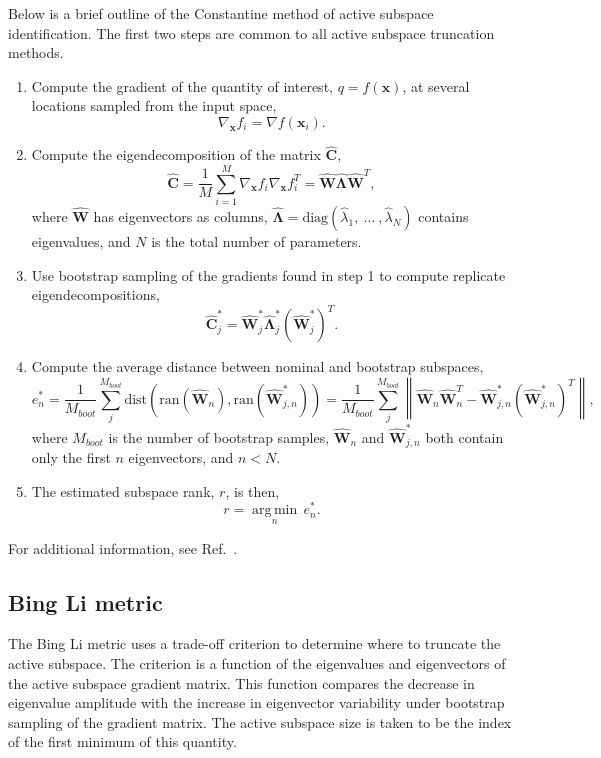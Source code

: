 Below is a brief outline of the Constantine method of active subspace 
identification. The first two steps are common to all active subspace 
truncation methods.
\begin{enumerate}
\item Compute the gradient of the quantity of interest, $q = f(\mathbf{x})$,
    at several locations sampled from the input space,
    $$\nabla_{\mathbf{x}} f_i = \nabla f(\mathbf{x}_i).$$

\item Compute the eigendecomposition of the matrix $\hat{\mathbf{C}}$,
    $$\hat{\mathbf{C}} = \frac{1}{M}\sum_{i=1}^{M}\nabla_{\mathbf{x}} f_i\nabla_{\mathbf{x}} f_i^T = \hat{\mathbf{W}}\hat{\mathbf{\Lambda}}\hat{\mathbf{W}}^T,$$
    where $\hat{\mathbf{W}}$ has eigenvectors as columns, 
    $\hat{\mathbf{\Lambda}} = \text{diag}(\hat{\lambda}_1,\:\ldots\:,\hat{\lambda}_N)$
    contains eigenvalues, and $N$ is the total number of parameters.

\item Use bootstrap sampling of the gradients found in step 1 to compute replicate
    eigendecompositions,
    $$\hat{\mathbf{C}}_j^* = \hat{\mathbf{W}}_j^*\hat{\mathbf{\Lambda}}_j^*\left(\hat{\mathbf{W}}_j^*\right)^T.$$

\item Compute the average distance between nominal and bootstrap subspaces,
    $$e^*_n = \frac{1}{M_{boot}}\sum_j^{M_{boot}} \text{dist}(\text{ran}(\hat{\mathbf{W}}_n), \text{ran}(\hat{\mathbf{W}}_{j,n}^*)) = \frac{1}{M_{boot}}\sum_j^{M_{boot}} \left\| \hat{\mathbf{W}}_n\hat{\mathbf{W}}_n^T - \hat{\mathbf{W}}_{j,n}^*\left(\hat{\mathbf{W}}_{j,n}^*\right)^T\right\|,$$
    where $M_{boot}$ is the number of bootstrap samples, 
    $\hat{\mathbf{W}}_n$ and $\hat{\mathbf{W}}_{j,n}^*$ both contain 
    only the first $n$ eigenvectors, and $n < N$.

\item The estimated subspace rank, $r$, is then,
    $$r = \operatorname*{arg\,min}_n \, e^*_n.$$
\end{enumerate}

For additional information, see Ref.~\cite{constantine2015active}.

\subsection{Bing Li metric}\label{SubSec:bingli}
The Bing Li metric uses a trade-off criterion to determine where to truncate the active subspace.
The criterion is a function of the eigenvalues
and eigenvectors of the active subspace gradient matrix. This function compares 
the decrease in eigenvalue amplitude with the increase in eigenvector variability
under bootstrap sampling of the gradient matrix. The active subspace size is taken to 
be the index of the first minimum of this quantity.

